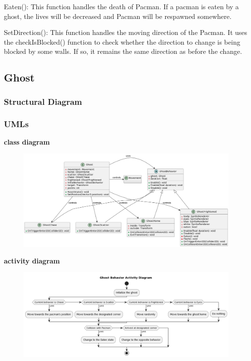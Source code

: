 \documentclass[11pt]{article}
\begin{document}
Eaten(): This function handles the death of Pacman. If a pacman is eaten by a ghost, the lives will be decreased and Pacman will be respawned somewhere.

SetDirection(): This function handles the moving direction of the Pacman. It uses the checkIsBlocked() function to check whether the direction to change is being blocked by some walls. If so, it remains the same direction as before the change.
\subsection{Ghost}
\subsubsection{Structural Diagram}
\subsubsection{UMLs}
\textbf{class diagram}\\
\begin{figure}[H]
    \centering
    \includegraphics*[scale=0.25]{Ghost_Class.png}
\end{figure}
\textbf{activity diagram}\\
\begin{figure}[H]
    \centering
    \includegraphics*[scale=0.3]{Ghost_Activity.png}
\end{figure}
\end{document}
